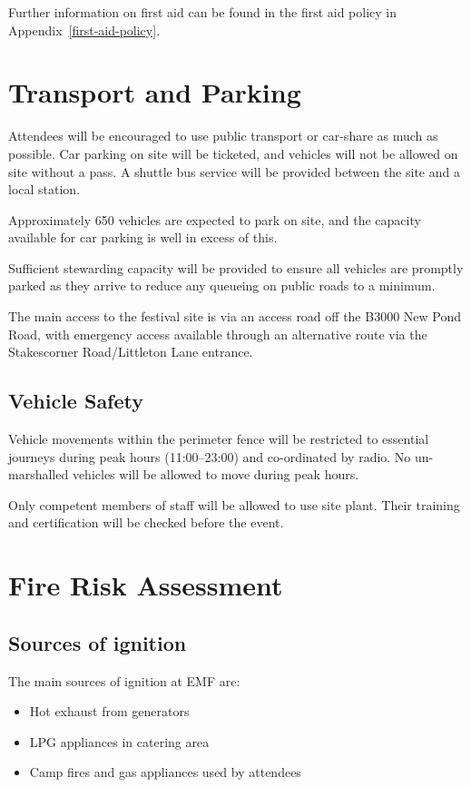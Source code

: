 Further information on first aid can be found in the first aid policy in Appendix~\ref{first-aid-policy}.

\section{Transport and Parking}

Attendees will be encouraged to use public transport or car-share as much as possible. Car parking on site will be ticketed,
and vehicles will not be allowed on site without a pass. A shuttle bus service will be provided between the site and a local station.

Approximately 650 vehicles are expected to park on site, and the capacity available for car parking is well in excess of this.

Sufficient stewarding capacity will be provided to ensure all vehicles are promptly parked as they arrive to reduce any queueing
on public roads to a minimum.

The main access to the festival site is via an access road off the B3000 New Pond Road, with emergency access available
through an alternative route via the Stakescorner Road/Littleton Lane entrance.

\subsection{Vehicle Safety}

Vehicle movements within the perimeter fence will be restricted to essential journeys during peak hours (11:00--23:00) and co-ordinated by radio. No un-marshalled vehicles will be allowed to move during peak hours.

Only competent members of staff will be allowed to use site plant. Their training and certification will be checked before the event.

\section{Fire Risk Assessment}
\label{fire}
\subsection{Sources of ignition}

The main sources of ignition at EMF are:

\begin{itemize}
\item Hot exhaust from generators
\item LPG appliances in catering area
\item Camp fires and gas appliances used by attendees
\end{itemize}

